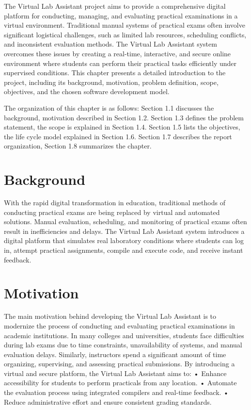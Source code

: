 The Virtual Lab Assistant project aims to provide a comprehensive digital platform for conducting, managing, and evaluating practical examinations in a virtual environment. Traditional manual systems of practical exams often involve significant logistical challenges, such as limited lab resources, scheduling conflicts, and inconsistent evaluation methods. The Virtual Lab Assistant system overcomes these issues by creating a real-time, interactive, and secure online environment where students can perform their practical tasks efficiently under supervised conditions.
This chapter presents a detailed introduction to the project, including its background, motivation, problem definition, scope, objectives, and the chosen software development model. 


The organization of this chapter is as follows: Section 1.1 discusses the background, motivation described in Section 1.2. Section 1.3 defines the problem statement, the scope is explained in Section 1.4. Section 1.5 lists the objectives, the life cycle model explained in Section 1.6.
Section 1.7 describes the report organization, Section 1.8 summarizes the chapter.

 



\section{Background}

With the rapid digital transformation in education, traditional methods of conducting practical exams are being replaced by virtual and automated solutions. Manual evaluation, scheduling, and monitoring of practical exams often result in inefficiencies and delays. The Virtual Lab Assistant system introduces a digital platform that simulates real laboratory conditions where students can log in, attempt practical assignments, compile and execute code, and receive instant feedback.

\section{Motivation}
The main motivation behind developing the Virtual Lab Assistant is to modernize the process of conducting and evaluating practical examinations in academic institutions.
In many colleges and universities, students face difficulties during lab exams due to time constraints, unavailability of systems, and manual evaluation delays. Similarly, instructors spend a significant amount of time organizing, supervising, and assessing practical submissions.
By introducing a virtual and secure platform, the Virtual Lab Assistant aims to:
•	Enhance accessibility for students to perform practicals from any location.
•	Automate the evaluation process using integrated compilers and real-time feedback.
•	Reduce administrative effort and ensure consistent grading standards.

